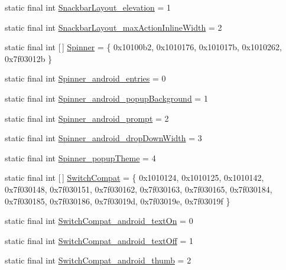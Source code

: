 \begin{DoxyCompactItemize}
static final int \mbox{\hyperlink{classandroid_1_1support_1_1design_1_1_r_1_1styleable_a54f3338cb1db3190d4f8d5f3a2475ddd}{Snackbar\+Layout\+\_\+elevation}} = 1
\item 
static final int \mbox{\hyperlink{classandroid_1_1support_1_1design_1_1_r_1_1styleable_a0c233bcf31327c9409249283a7e660fa}{Snackbar\+Layout\+\_\+max\+Action\+Inline\+Width}} = 2
\item 
static final int \mbox{[}$\,$\mbox{]} \mbox{\hyperlink{classandroid_1_1support_1_1design_1_1_r_1_1styleable_ac36e55e5a1c717e866dcadd92552fa64}{Spinner}} = \{ 0x10100b2, 0x1010176, 0x101017b, 0x1010262, 0x7f03012b \}
\item 
static final int \mbox{\hyperlink{classandroid_1_1support_1_1design_1_1_r_1_1styleable_aff0dfa8ecdb7641842809aebe5e65d73}{Spinner\+\_\+android\+\_\+entries}} = 0
\item 
static final int \mbox{\hyperlink{classandroid_1_1support_1_1design_1_1_r_1_1styleable_ad937f167c55cbb577ed47c893518d69b}{Spinner\+\_\+android\+\_\+popup\+Background}} = 1
\item 
static final int \mbox{\hyperlink{classandroid_1_1support_1_1design_1_1_r_1_1styleable_a6465e68ffbefc95670289286dfc4502c}{Spinner\+\_\+android\+\_\+prompt}} = 2
\item 
static final int \mbox{\hyperlink{classandroid_1_1support_1_1design_1_1_r_1_1styleable_ab7674adcb14e8faef5f8b8ba404f68f0}{Spinner\+\_\+android\+\_\+drop\+Down\+Width}} = 3
\item 
static final int \mbox{\hyperlink{classandroid_1_1support_1_1design_1_1_r_1_1styleable_a6ca303c6731fcf4e6937395aaf5ddf89}{Spinner\+\_\+popup\+Theme}} = 4
\item 
static final int \mbox{[}$\,$\mbox{]} \mbox{\hyperlink{classandroid_1_1support_1_1design_1_1_r_1_1styleable_a7389a923bf3e321b6b5d10b0589547a1}{Switch\+Compat}} = \{ 0x1010124, 0x1010125, 0x1010142, 0x7f030148, 0x7f030151, 0x7f030162, 0x7f030163, 0x7f030165, 0x7f030184, 0x7f030185, 0x7f030186, 0x7f03019d, 0x7f03019e, 0x7f03019f \}
\item 
static final int \mbox{\hyperlink{classandroid_1_1support_1_1design_1_1_r_1_1styleable_a24a13a92821889139973436085501029}{Switch\+Compat\+\_\+android\+\_\+text\+On}} = 0
\item 
static final int \mbox{\hyperlink{classandroid_1_1support_1_1design_1_1_r_1_1styleable_a837987a3c039d6ff4cbd72571612d0ee}{Switch\+Compat\+\_\+android\+\_\+text\+Off}} = 1
\item 
static final int \mbox{\hyperlink{classandroid_1_1support_1_1design_1_1_r_1_1styleable_a3516d26bd8d9a81bed9002886aa07d91}{Switch\+Compat\+\_\+android\+\_\+thumb}} = 2

\end{DoxyCompactItemize}
